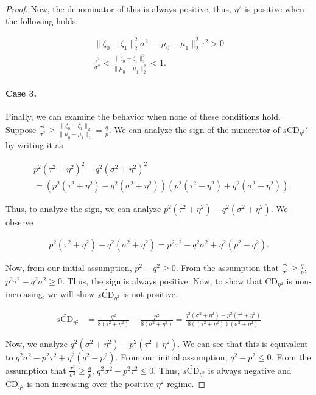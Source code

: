 \documentclass[10pt,a4paper]{amsart}
\begin{document}
\begin{proof}
Now, the denominator of this is always positive, thus, $\eta^2$ is positive when the following holds:

\begin{align}
    \|\zeta_0 - \zeta_1\|_2^2\sigma^2-|\mu_0 - \mu_1\|_2^2\tau^2 > 0
    \\ \frac{\tau^2}{\sigma^2} < \frac{\|\zeta_0 - \zeta_1\|^2_2}{\|\mu_0 - \mu_1\|^2_2} < 1.
\end{align}

\paragraph{Case 3.} Finally, we can examine the behavior when none of these conditions hold. Suppose $\frac{\tau^2}{\sigma^2} \geq \frac{\|\zeta_0 - \zeta_1\|_2}{\|\mu_0 - \mu_1\|_2} = \frac{q}{p}$. We can analyze the sign of the numerator of $s\widetilde{\text{CD}}_{\eta^2}'$ by writing it as

\begin{align}
    &p^2(\tau^2 + \eta^2)^2 - q^2(\sigma^2 + \eta^2)^2 \\
            &= (p^2(\tau^2 + \eta^2) - q^2(\sigma^2 + \eta^2))(p^2(\tau^2 + \eta^2) + q^2(\sigma^2 + \eta^2)).
\end{align}

Thus, to analyze the sign, we can analyze $p^2(\tau^2 + \eta^2) - q^2(\sigma^2 + \eta^2)$. We observe

\begin{align}
    p^2(\tau^2 + \eta^2) - q^2(\sigma^2 + \eta^2) = p^2\tau^2 - q^2\sigma^2 + \eta^2(p^2 - q^2).
\end{align}

Now, from our initial assumption, $p^2 - q^2 \geq 0$. From the assumption that $\frac{\tau^2}{\sigma^2} \geq  \frac{q}{p}$, $p^2\tau^2 - q^2\sigma^2 \geq 0$. Thus, the sign is always positive. Now, to show that $\widetilde{\text{CD}}_{\eta^2}$ is non-increasing, we will show $s\widetilde{\text{CD}}_{\eta^2}$ is not positive. 

\begin{align}
    s\widetilde{\text{CD}}_{\eta^2} &= \frac{q^2}{8(\tau^2 + \eta^2)} - \frac{p^2}{8(\sigma^2 + \eta^2)}  = \frac{q^2(\sigma^2 + \eta^2) - p^2(\tau^2 + \eta^2)}{8((\tau^2 + \eta^2))(\sigma^2 + \eta^2)}
\end{align}

Now, we analyze $q^2(\sigma^2 + \eta^2) - p^2(\tau^2 + \eta^2)$. We can see that this is equivalent to $q^2\sigma^2 - p^2\tau^2 + \eta^2(q^2 - p^2)$. From our initial assumption, $q^2 - p^2 \leq 0$. From the assumption that $\frac{\tau^2}{\sigma^2} \geq \frac{q}{p}$, $q^2\sigma^2 - p^2\tau^2 \leq 0$. Thus, $s\widetilde{\text{CD}}_{\eta^2}$ is always negative and $\widetilde{\text{CD}}_{\eta^2}$ is non-increasing over the positive $\eta^2$ regime.
\end{proof}
\end{document}
